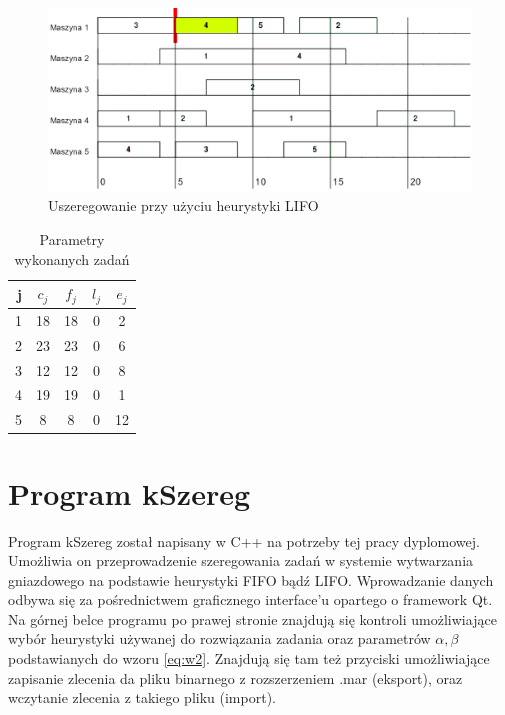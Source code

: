 \documentclass[twoside]{kInzynierka}
\begin{document}
\begin{figure}[htb]
    \centering
    \includegraphics[width=\textwidth, keepaspectratio=true]{./obrazki/lifo}
    \caption{Uszeregowanie przy użyciu heurystyki LIFO}
\end{figure}
\begin{table}[htb]
	\centering
	\caption{Parametry wykonanych zadań}
	\begin{tabular}{ | r | c | c | c | c |}
	\hline
	j	& \(c_j\)	& \(f_j\)	& \(l_j\)	& \(e_j\)	\\ \hline
	1	& 18	& 18	& 0	& 2	\\ \hline
	2	& 23	& 23	& 0	& 6	\\ \hline
	3	& 12	& 12	& 0	& 8	\\ \hline
	4	& 19	& 19	& 0	& 1	\\ \hline
	5	& 8	& 8	& 0	& 12	\\ \hline
	\end{tabular}
\end{table}
       
\section        {Program kSzereg}
Program kSzereg został napisany w C++ na potrzeby tej pracy dyplomowej. Umożliwia on przeprowadzenie szeregowania zadań w systemie wytwarzania gniazdowego na podstawie heurystyki FIFO bądź LIFO. Wprowadzanie danych odbywa się za pośrednictwem graficznego interface'u opartego o framework Qt. Na górnej belce programu po prawej stronie znajdują się kontroli umożliwiające wybór heurystyki używanej do rozwiązania zadania oraz parametrów \(\alpha, \beta\) podstawianych do wzoru \eqref{eq:w2}. Znajdują się tam też przyciski umożliwiające zapisanie zlecenia da pliku binarnego z rozszerzeniem .mar (eksport), oraz wczytanie zlecenia z takiego pliku (import). 
\end{document}
